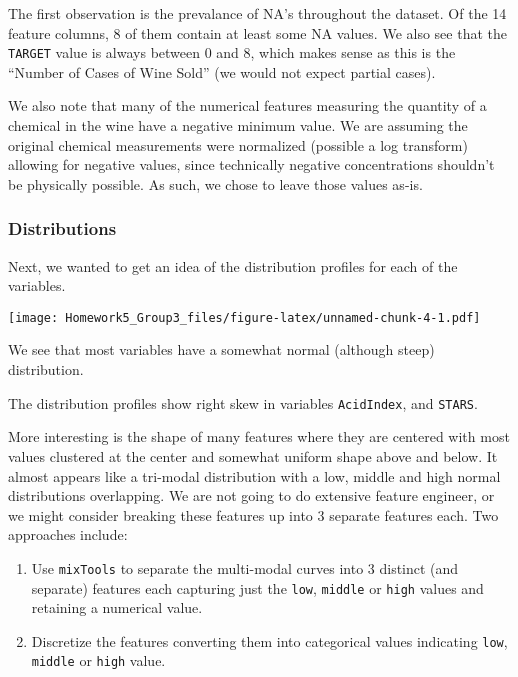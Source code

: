 \documentclass[
]{article}
\providecommand{\tightlist}{%
  \setlength{\itemsep}{0pt}\setlength{\parskip}{0pt}}
\begin{document}
The first observation is the prevalance of NA's throughout the dataset.
Of the 14 feature columns, 8 of them contain at least some NA values. We
also see that the \texttt{TARGET} value is always between 0 and 8, which
makes sense as this is the ``Number of Cases of Wine Sold'' (we would
not expect partial cases).

We also note that many of the numerical features measuring the quantity
of a chemical in the wine have a negative minimum value. We are assuming
the original chemical measurements were normalized (possible a log
transform) allowing for negative values, since technically negative
concentrations shouldn't be physically possible. As such, we chose to
leave those values as-is.

\hypertarget{distributions}{%
\subsubsection{Distributions}\label{distributions}}

Next, we wanted to get an idea of the distribution profiles for each of
the variables.

\texttt{[image: Homework5\_Group3\_files/figure-latex/unnamed-chunk-4-1.pdf]}

We see that most variables have a somewhat normal (although steep)
distribution.

The distribution profiles show right skew in variables
\texttt{AcidIndex}, and \texttt{STARS}.

More interesting is the shape of many features where they are centered
with most values clustered at the center and somewhat uniform shape
above and below. It almost appears like a tri-modal distribution with a
low, middle and high normal distributions overlapping. We are not going
to do extensive feature engineer, or we might consider breaking these
features up into 3 separate features each. Two approaches include:

\begin{enumerate}
\def\labelenumi{\arabic{enumi}.}
\tightlist
\item
  Use \texttt{mixTools} to separate the multi-modal curves into 3
  distinct (and separate) features each capturing just the \texttt{low},
  \texttt{middle} or \texttt{high} values and retaining a numerical
  value.
\item
  Discretize the features converting them into categorical values
  indicating \texttt{low}, \texttt{middle} or \texttt{high} value.
\end{enumerate}
\end{document}
